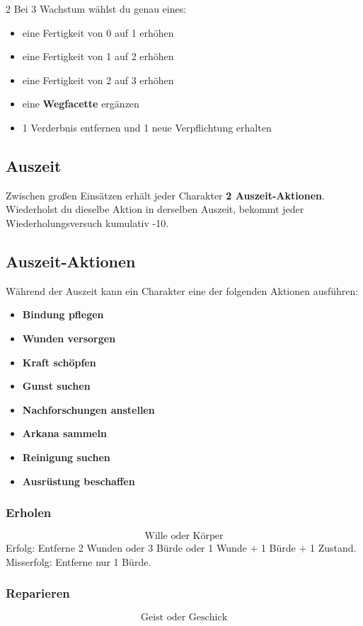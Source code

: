 \begin{multicols*}{2}
Bei 3 Wachstum wählst du genau eines:
\begin{itemize}[leftmargin=*]
\item eine Fertigkeit von 0 auf 1 erhöhen
\item eine Fertigkeit von 1 auf 2 erhöhen
\item eine Fertigkeit von 2 auf 3 erhöhen
\item eine \textbf{Wegfacette} ergänzen
\item 1 Verderbnis entfernen und 1 neue Verpflichtung erhalten
\end{itemize}

\subsection{Auszeit}
Zwischen großen Einsätzen erhält jeder Charakter \textbf{2 Auszeit-Aktionen}.
Wiederholst du dieselbe Aktion in derselben Auszeit, bekommt jeder Wiederholungsversuch kumulativ -10.

\subsection{Auszeit-Aktionen}

Während der Auszeit kann ein Charakter eine der folgenden Aktionen ausführen:

\begin{itemize}[leftmargin=*]
\item \textbf{Bindung pflegen}
\item \textbf{Wunden versorgen}
\item \textbf{Kraft schöpfen}
\item \textbf{Gunst suchen}
\item \textbf{Nachforschungen anstellen}
\item \textbf{Arkana sammeln}
\item \textbf{Reinigung suchen}
\item \textbf{Ausrüstung beschaffen}
\end{itemize}

\subsubsection{Erholen}
\[
\text{Wille oder Körper}
\]
Erfolg: Entferne 2 Wunden oder 3 Bürde oder 1 Wunde + 1 Bürde + 1 Zustand.\\
Misserfolg: Entferne nur 1 Bürde.

\subsubsection{Reparieren}
\[
\text{Geist oder Geschick}
\]


\end{multicols*}
